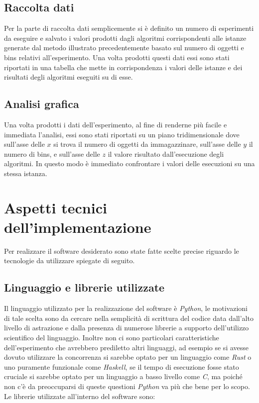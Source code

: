 \subsection{Raccolta dati}
Per la parte di raccolta dati semplicemente si è definito un numero di esperimenti da eseguire e salvato i valori prodotti dagli algoritmi corrispondenti
alle istanze generate dal metodo illustrato precedentemente basato sul numero di oggetti e bins relativi all'esperimento. Una volta prodotti questi dati
essi sono stati riportati in una tabella che mette in corrispondenza i valori delle istanze e dei risultati degli algoritmi eseguiti su di esse.


\subsection{Analisi grafica}
Una volta prodotti i dati dell'esperimento, al fine di renderne più facile e immediata l'analisi, essi sono stati riportati su un piano tridimensionale 
dove sull'asse delle $ x $ si trova il numero di oggetti da immagazzinare, sull'asse delle $ y $ il numero di bins, e sull'asse delle $ z $
il valore risultato dall'esecuzione degli algoritmi. In questo modo è immediato confrontare i valori delle esecuzioni su una stessa istanza.


\section{Aspetti tecnici dell'implementazione}
Per realizzare il software desiderato sono state fatte scelte precise riguardo le tecnologie da utilizzare spiegate di seguito.

\subsection{Linguaggio e librerie utilizzate}
Il linguaggio utilizzato per la realizzazione del software è \textit{Python}, le motivazioni di tale scelta sono da cercare nella semplicità di scrittura 
del codice data dall'alto livello di astrazione e dalla presenza di numerose librerie a supporto dell'utilizzo scientifico del linguaggio. Inoltre
non ci sono particolari caratteristiche dell'esperimento che avrebbero prediletto altri linguaggi, ad esempio se si avesse dovuto utilizzare la concorrenza 
si sarebbe optato per un linguaggio come \textit{Rust} o uno puramente funzionale come \textit{Haskell}, se il tempo di esecuzione fosse stato cruciale si sarebbe
optato per un linguaggio a basso livello come \textit{C}, ma poiché non c'è da preoccuparsi di queste questioni \textit{Python} va più che bene per lo
scopo.\\
Le librerie utilizzate all'interno del software sono:


